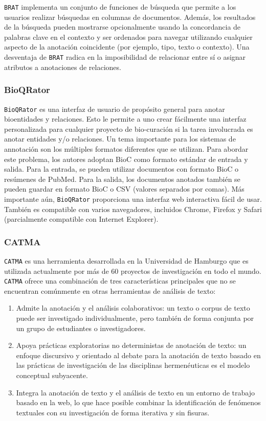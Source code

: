 \texttt{BRAT} implementa un conjunto de funciones de búsqueda que permite a los usuarios realizar búsquedas en columnas de documentos.
Además, los resultados de la búsqueda pueden mostrarse opcionalmente usando la concordancia de palabras clave en el contexto y ser ordenados para navegar utilizando cualquier aspecto de la anotación coincidente (por ejemplo, tipo, texto o contexto).
Una desventaja de \texttt{BRAT} radica en la imposibilidad de relacionar entre sí o asignar atributos a anotaciones de relaciones.

\subsubsection*{BioQRator}

\texttt{BioQRator} es una interfaz de usuario de propósito general para anotar bioentidades y relaciones.
Esto le permite a uno crear fácilmente una interfaz personalizada para cualquier proyecto de bio-curación si la tarea involucrada es anotar entidades y/o relaciones.
Un tema importante para los sistemas de annotación son los múltiples formatos diferentes que se utilizan.
Para abordar este problema, los autores adoptan BioC como formato estándar de entrada y salida.
Para la entrada, se pueden utilizar documentos con formato BioC o resúmenes de PubMed.
Para la salida, los documentos anotados también se pueden guardar en formato BioC o CSV (valores separados por comas). Más importante aún, \texttt{BioQRator} proporciona una interfaz web interactiva fácil de usar.
También es compatible con varios navegadores, incluidos Chrome, Firefox y Safari (parcialmente compatible con Internet Explorer).

\subsubsection*{CATMA}

\texttt{CATMA} es una herramienta desarrollada en la Universidad de Hamburgo que es utilizada actualmente por más de 60 proyectos de investigación en todo el mundo.
\texttt{CATMA} ofrece una combinación de tres características principales que no se encuentran comúnmente en otras herramientas de análisis de texto:

\begin{enumerate}
  \item Admite la anotación y el análisis colaborativos: un texto o corpus de texto puede ser investigado individualmente, pero también de forma conjunta por un grupo de estudiantes o investigadores.
  \item  Apoya prácticas exploratorias no deterministas de anotación de texto: un enfoque discursivo y orientado al debate para la anotación de texto basado en las prácticas de investigación de las disciplinas hermenéuticas es el modelo conceptual subyacente.
  \item Integra la anotación de texto y el análisis de texto en un entorno de trabajo basado en la web, lo que hace posible combinar la identificación de fenómenos textuales con su investigación de forma iterativa y sin fisuras.
\end{enumerate}

